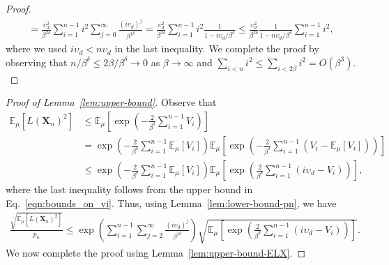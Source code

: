 \documentclass[pdflatex, sn-mathphys-ay]{sn-jnl}%
\renewcommand{\v}[1]{\boldsymbol{#1}}
\newcommand{\ee}{\mathbb{E}}
\newcommand{\mX}{\v{X}}
\newcommand{\lt}{\left}
\newcommand{\rt}{\right}
\theoremstyle{thmstyleone}%
\theoremstyle{thmstyletwo}%
\theoremstyle{thmstylethree}%
\begin{document}
\begin{appendices}
\begin{proof}
\begin{align*}
    = \frac{\upsilon_d^2}{\beta^{2\delta}} \sum_{i = 1}^{n -1} i^2 \sum_{j = 0}^\infty \frac{(i\upsilon_d)^j}{\beta^{j\delta}} 
    = \frac{\upsilon_d^2}{\beta^{2\delta}} \sum_{i = 1}^{n -1} i^2 \frac{1}{1 - i\upsilon_d/\beta^{\delta}}
    \leq \frac{\upsilon_d^2}{\beta^{2\delta}} \frac{1}{1 - n\upsilon_d/\beta^{\delta}}\sum_{i = 1}^{n -1} i^2,
\end{align*}
where we used $i\upsilon_d < n\upsilon_d$ in the last inequality.
We complete the proof by observing that $n/\beta^\delta \leq 2\beta/\beta^\delta \to 0$ as $\beta \to \infty$ and 
$\sum_{i < n} i^2 \leq \sum_{i < 2\beta} i^2 = O(\beta^3).$
\end{proof}
\begin{proof}[Proof of Lemma~\ref{lem:upper-bound}]
Observe that
\begin{align*}
    \ee_\mu[L(\mX_n)^2] &\leq \ee_\mu\lt[\exp\lt(-  \frac{2}{\beta^{\delta}}\sum_{i =1}^{n-1} V_i\rt)\rt]\\
                        &= \exp\lt(- \frac{2}{\beta^{\delta}} \sum_{i =1}^{n-1} \ee_\mu[V_i]\rt) \ee_\mu\lt[\exp\lt(-  \frac{2}{\beta^{\delta}}  \sum_{i =1}^{n-1} (V_i - \ee_{\mu}[V_i])\rt)\rt]\\
                        &\leq \exp\lt(-  \frac{2}{\beta^{\delta}} \sum_{i =1}^{n-1} \ee_\mu[V_i]\rt) \ee_\mu\lt[\exp\lt(\frac{2}{\beta^{\delta}}  \sum_{i =1}^{n-1} (i\upsilon_d - V_i)\rt)\rt],
\end{align*}
where the last inequality follows from the upper bound in Eq.~\eqref{eqn:bounds_on_vi}. Thus, using Lemma~\ref{lem:lower-bound-pn}, we have \begin{align}
\frac{\sqrt{\ee_\mu[L(\mX_n)^2]}}{p_n} \leq \exp\lt( \sum_{i = 1}^{n -1} \sum_{j = 2}^\infty \frac{(i\upsilon_d)^j}{\beta^{j\delta}}\rt) \sqrt{\ee_\mu\lt[\exp\lt(\frac{2}{\beta^{\delta}}  \sum_{i =1}^{n-1} (i\upsilon_d - V_i)\rt)\rt]}.\label{eqn:upper-bdd-1}
\end{align}
We now complete the proof using Lemma~\ref{lem:upper-bound-ELX}.
\end{proof}


\end{appendices}



\end{document}
